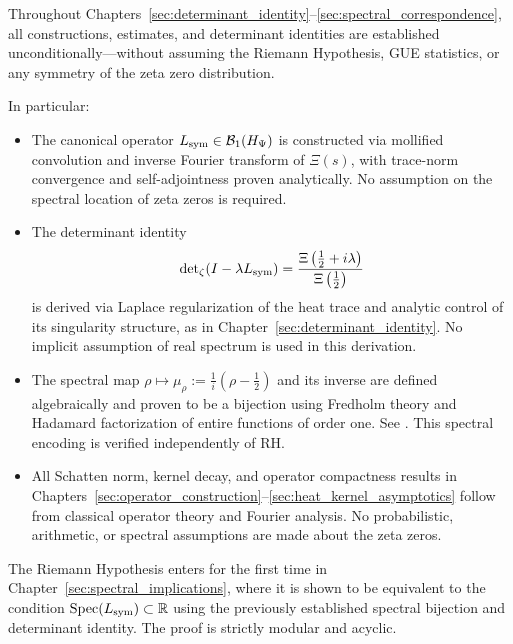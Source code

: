 \begin{remark}
\label{rem:no_rh_assumption}
Throughout Chapters~\ref{sec:determinant_identity}–\ref{sec:spectral_correspondence}, all constructions, estimates, and determinant identities are established unconditionally—without assuming the Riemann Hypothesis, GUE statistics, or any symmetry of the zeta zero distribution.

\medskip

In particular:
\begin{itemize}
  \item The canonical operator \( L_{\mathrm{sym}} \in \mathcal{B}_1(H_{\Psi}) \) is constructed via mollified convolution and inverse Fourier transform of \( \Xi(s) \), with trace-norm convergence and self-adjointness proven analytically. No assumption on the spectral location of zeta zeros is required.

  \item The determinant identity
  \[
  \det\nolimits_\zeta(I - \lambda L_{\mathrm{sym}}) = \frac{\Xi\left( \tfrac{1}{2} + i\lambda \right)}{\Xi\left( \tfrac{1}{2} \right)}
  \]
  is derived via Laplace regularization of the heat trace and analytic control of its singularity structure, as in Chapter~\ref{sec:determinant_identity}. No implicit assumption of real spectrum is used in this derivation.

  \item The spectral map \( \rho \mapsto \mu_\rho := \tfrac{1}{i}(\rho - \tfrac{1}{2}) \) and its inverse are defined algebraically and proven to be a bijection using Fredholm theory and Hadamard factorization of entire functions of order one. See . This spectral encoding is verified independently of RH.

  \item All Schatten norm, kernel decay, and operator compactness results in Chapters~\ref{sec:operator_construction}–\ref{sec:heat_kernel_asymptotics} follow from classical operator theory and Fourier analysis. No probabilistic, arithmetic, or spectral assumptions are made about the zeta zeros.
\end{itemize}

\medskip

\noindent
The Riemann Hypothesis enters for the first time in Chapter~\ref{sec:spectral_implications}, where it is shown to be equivalent to the condition \( \operatorname{Spec}(L_{\mathrm{sym}}) \subset \mathbb{R} \) using the previously established spectral bijection and determinant identity. The proof is strictly modular and acyclic.
\end{remark}
